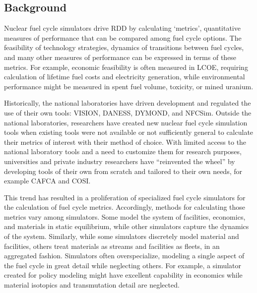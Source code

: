 \subsection{Background}



Nuclear fuel cycle simulators drive \gls{RDD} by calculating `metrics', 
quantitative measures of performance that 
can be compared among fuel cycle options. The feasibility of technology 
strategies, dynamics of transitions between fuel cycles, and many other 
measures of performance can be expressed in terms of these metrics. For example, 
economic feasibility is often measured in \gls{LCOE}, requiring calculation of
lifetime fuel costs and electricity generation, 
while environmental performance might be measured in spent fuel volume, 
  toxicity, or mined uranium.

Historically, the national laboratories have driven development and regulated 
the use of their own tools: \gls{VISION}\cite{jacobson_verifiable_2010}, 
\gls{DANESS}\cite{van_den_durpel_daness_2009}, 
\gls{DYMOND}\cite{yacout_modeling_2005}, and 
\gls{NFCSim}\cite{schneider_nfcsim:_2005}. 
Outside the national laboratories, researchers have created new nuclear fuel cycle 
simulation tools when existing tools were not available or not sufficiently 
general to calculate their metrics of interest with their method of choice.  
With limited access to the national laboratory tools and a need to customize 
them for research purposes, universities and private industry researchers have 
``reinvented the wheel'' by developing tools of their own from scratch and 
tailored to their own needs, for example \gls{CAFCA}\cite{guerin_impact_2009} and 
\gls{COSI}\cite{boucher_cosi_2005,boucher_cosi:_2006,meyer_new_2009,coquelet-pascal_comparison_2011}. 

This trend has resulted in a proliferation of specialized
fuel cycle simulators for the calculation of fuel cycle metrics.  Accordingly, methods 
for calculating those metrics vary among simulators. Some model the 
system of facilities, economics, and materials in static equilibrium, while 
other simulators capture the dynamics of the system.  
Similarly, while some simulators discretely model material and facilities, 
others treat materials as streams and facilities as fleets, in an aggregated 
fashion. Simulators often overspecialize, 
modeling a single aspect of the fuel cycle in great detail while neglecting 
others. For example, a simulator created for policy modeling might have excellent 
capability in economics while material isotopics and transmutation detail are 
neglected.

